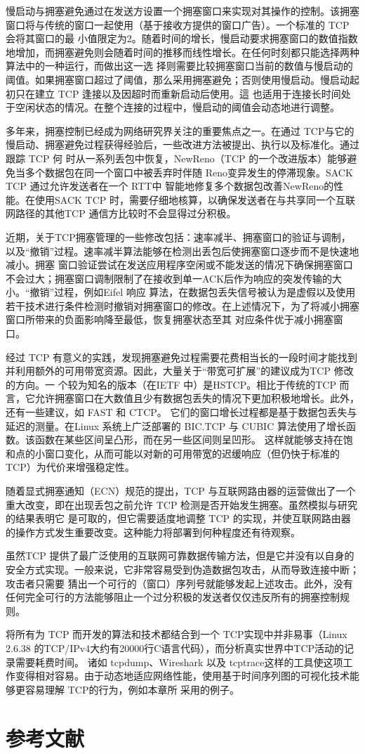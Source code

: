 慢启动与拥塞避免通过在发送方设置一个拥塞窗口来实现对其操作的控制。该拥塞窗口将与传统的窗口一起使用（基于接收方提供的窗口广告）。一个标准的 TCP 会将其窗口的最
小值限定为2。随着时间的增长，慢启动要求拥塞窗口的数值指数地增加，而拥塞避免则会随着时间的推移而线性增长。在任何时刻都只能选择两种算法中的一种运行，而做出这一选
择则需要比较拥塞窗口当前的数值与慢启动的阈值。如果拥塞窗口超过了阈值，那么采用拥塞避免；否则使用慢启动。慢启动起初只在建立 TCP 逢接以及因超时而重新启动后使用。這
也适用于连接长时间处于空闲状态的情况。在整个连接的过程中，慢启动的阈值会动态地进行调整。

多年来，拥塞控制已经成为网络研究界关注的重要焦点之一。在通过 TCP与它的慢启动、拥塞避免过程获得经验后，一些改进方法被提出、执行以及标准化。通过跟踪 TCP 何
时从一系列丢包中恢复，NewReno（TCP 的一个改进版本）能够避免当多个数据包在同一个窗口中被丢弃时伴随 Reno变异发生的停滞现象。SACK TCP 通过允许发送者在一个 RTT中
智能地修复多个数据包改善NewReno的性能。在使用SACK TCP 时，需要仔细地核算，以确保发送者在与共享同一个互联网路径的其他TCP 通信方比较时不会显得过分积极。

近期，关于TCP拥塞管理的一些修改包括：速率减半、拥塞窗口的验证与调制，以及“撤销”过程。速率减半算法能够在检测出丢包后使拥塞窗口逐步而不是快速地减小。拥塞
窗口验证尝试在发送应用程序空闲或不能发送的情况下确保拥塞窗口不会过大；拥塞窗口调制限制了在接收到单一ACK后作为响应的突发传输的大小。“撤销”过程，例如Eifel 响应
算法，在数据包丢失信号被认为是虚假以及使用若干技术进行条件检测时撤销对拥塞窗口的修改。在上述情况下，为了将减小拥塞窗口所带来的负面影响降至最低，恢复拥塞状态至其
对应条件优于减小拥塞窗口。

经过 TCP 有意义的实践，发现拥塞避免过程需要花费相当长的一段时间才能找到并利用额外的可用带宽资源。因此，大量关于“带宽可扩展”的建议成为TCP 修改的方向。一
个较为知名的版本（在IETF 中）是HSTCP。相比于传统的TCP 而言，它允许拥塞窗口在大数值且少有数据包丢失的情况下更加积极地增长。此外，还有一些建议，如 FAST 和 CTCP。
它们的窗口增长过程都是基于数据包丢失与延迟的测量。在Linux 系统上广泛部署的 BIC.TCP 与 CUBIC 算法使用了增长函数。该函数在某些区间呈凸形，而在另一些区间则呈凹形。
这样就能够支持在饱和点的小窗口变化，从而可能以对新的可用带宽的迟缓响应（但仍快于标准的 TCP）为代价来增强稳定性。

随着显式拥塞通知（ECN）规范的提出，TCP 与互联网路由器的运营做出了一个重大改变，即在出现丢包之前允许 TCP 检测是否开始发生拥塞。虽然模拟与研究的结果表明它
是可取的，但它需要适度地调整 TCP 的实现，并使互联网路由器的操作方式发生重要改变。这种能力将部署到何种程度还有待观察。

虽然TCP 提供了最广泛使用的互联网可靠数据传输方法，但是它并没有以自身的安全方式实现。一般来说，它非常容易受到伪造数据包攻击，从而导致连接中断；攻击者只需要
猜出一个可行的（窗口）序列号就能够发起上述攻击。此外，没有任何完全可行的方法能够阻止一个过分积极的发送者仅仅违反所有的拥塞控制规则。


将所有为 TCP 而开发的算法和技术都结合到一个 TCP实现中并非易事（Linux 2.6.38 的TCP/IPv4大约有20000行C语言代码），而分析真实世界中TCP活动的记录需要耗费时间。
诸如 tcpdump、Wireshark 以及 tcptrace这样的工具使这项工作变得相对容易。由于动态地适应网络性能，使用基于时间序列图的可视化技术能够更容易理解 TCP的行为，例如本章所
采用的例子。

\section{参考文献}